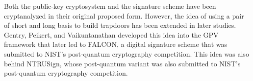 \documentclass[letterpaper,12pt]{article}
\begin{document}
Both the public-key cryptosystem and the signature scheme have been cryptanalyzed \cite{nguyen1999cryptanalysis}\cite{nguyen2006learning} in their original proposed form. However, the idea of using a pair of short and long basis to build trapdoors has been extended in later studies. Gentry, Peikert, and Vaikuntanathan developed this idea into the GPV framework\cite{gentry2008trapdoors} that later led to FALCON, a digital signature scheme that was submitted to NIST's post-quantum cryptography competition. This idea was also behind NTRUSign\cite{hoffstein2003ntrusign}, whose post-quantum variant was also submitted to NIST's post-quantum cryptography competition.



\end{document}
